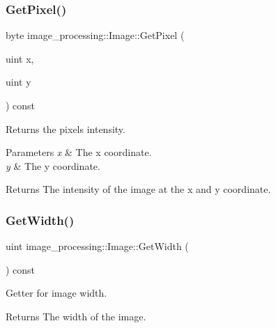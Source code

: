 \subsubsection{\texorpdfstring{Get\+Pixel()}{GetPixel()}}
{\footnotesize\ttfamily byte image\+\_\+processing\+::\+Image\+::\+Get\+Pixel (\begin{DoxyParamCaption}\item[{uint}]{x,  }\item[{uint}]{y }\end{DoxyParamCaption}) const}



Returns the pixels intensity. 


\begin{DoxyParams}{Parameters}
{\em x} & The x coordinate. \\
\hline
{\em y} & The y coordinate. \\
\hline
\end{DoxyParams}
\begin{DoxyReturn}{Returns}
The intensity of the image at the x and y coordinate. 
\end{DoxyReturn}
\mbox{\label{classimage__processing_1_1Image_a9781426393507ea891a8c2e312317a60}} 
\subsubsection{\texorpdfstring{Get\+Width()}{GetWidth()}}
{\footnotesize\ttfamily uint image\+\_\+processing\+::\+Image\+::\+Get\+Width (\begin{DoxyParamCaption}{ }\end{DoxyParamCaption}) const}



Getter for image width. 

\begin{DoxyReturn}{Returns}
The width of the image. 
\end{DoxyReturn}
\mbox{\label{classimage__processing_1_1Image_a705a802c9e2fef367b84debddd8cc826}} 
